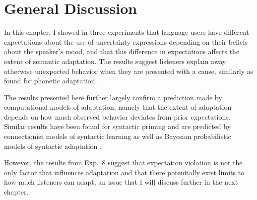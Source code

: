 
\section{General Discussion}

In this chapter, I showed in three experiments that language users have different expectations about the use of uncertainty expressions depending on their beliefs about the speaker's mood, and that this difference in expectations affects the extent of semantic adaptation. The results suggest listeners explain away otherwise unexpected behavior when they are presented with a cause, similarly as \textcite{Kraljic2008} found for phonetic adaptation.

The results presented here further largely confirm a prediction made by computational models of adaptation, namely that the extent of adaptation depends on how much observed behavior deviates from prior expectations. Similar results have been found for syntactic priming \cite{Jaeger2013} and are predicted by connectionist models of syntactic learning \cite{Chang2006} as well as Bayesian probabilistic models of syntactic adaptation \cite{Kleinschmidt2012}.

However, the results from Exp.~8 suggest that expectation violation is not the only factor that influences adaptation and that there potentially exist limits to how much listeners can adapt, an issue that I will discuss further in the next chapter. 
